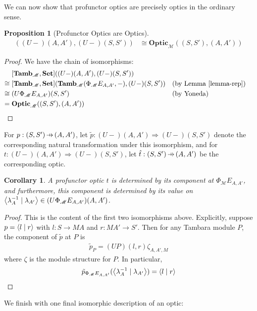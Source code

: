\documentclass[11pt,letterpaper]{article}
\theoremstyle{plain}
\newtheorem{proposition}[theorem]{Proposition}
\newtheorem{corollary}[theorem]{Corollary}
\theoremstyle{definition}
\newcommand{\M}{\mathscr{M}}
\newcommand{\Pastro}{\Phi}
\newcommand{\Set}{\mathbf{Set}}
\newcommand{\Tamb}{\mathbf{Tamb}}
\newcommand{\Optic}{\mathbf{Optic}}
\newcommand{\rep}[2]{{\ensuremath \left\langle #1 \mid #2 \right\rangle}}
\newcommand{\hto}{\ensuremath{\,\mathaccent\shortmid\rightarrow\,}}
\begin{document}
We can now show that profunctor optics are precisely optics in the ordinary sense.

\begin{proposition}[Profunctor Optics are Optics]\label{prop:profunctor-optics-are-optics}
  \begin{align*}
    [\Tamb_\M, \Set]((U-)(A,A'),(U-)(S,S')) &\cong \Optic_\M((S, S'), (A, A'))
  \end{align*}
\end{proposition}
\begin{proof}
  We have the chain of isomorphisms:
  \begin{align*}
    &[\Tamb_\M, \Set]((U-)(A,A'),(U-)(S,S')) \\
    \cong \;&[\Tamb_\M, \Set](\Tamb_\M(\Pastro_\M E_{A, A'}, -), (U-)(S,S'))  && \text{(by Lemma~\ref{lemma-rep})}\\
    \cong \;&(U\Pastro_\M E_{A, A'})(S,S')  && \text{(by Yoneda)} \\
    = \;&\Optic_\M((S, S'), (A, A'))
  \end{align*}
\end{proof}

For $p : (S, S') \hto (A, A')$, let $\tilde{p} : (U-)(A,A') \Rightarrow (U-)(S,S')$ denote the corresponding natural transformation under this isomorphism, and for $t : (U-)(A,A') \Rightarrow (U-)(S,S')$, let $\hat{t} : (S, S') \hto (A, A')$ be the corresponding optic.

\begin{corollary}
  A profunctor optic $t$ is determined by its component at $\Pastro_\M E_{A, A'}$, and furthermore, this component is determined by its value on $\rep{\lambda_A^{-1}}{\lambda_{A'}} \in (U \Pastro_\M E_{A, A'})(A, A')$.
\end{corollary}
\begin{proof}
  This is the content of the first two isomorphisms above. Explicitly, suppose $p = \rep{l}{r}$ with $l : S \to MA$ and $r : MA' \to S'$. Then for any Tambara module $P$, the component of $\tilde{p}$ at $P$ is
  \begin{align*}
    \tilde{p}_P = (UP)(l,r) \zeta_{A,A',M}
  \end{align*}
  where $\zeta$ is the module structure for $P$. In particular,
  \[
    \tilde{p}_{\Pastro_\M E_{A, A'}}(\rep{\lambda_A^{-1}}{\lambda_{A'}}) = \rep{l}{r}
  \]
\end{proof}

We finish with one final isomorphic description of an optic:
\end{document}
